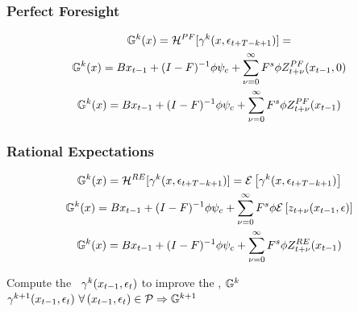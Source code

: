 \documentclass[tikz]{beamer}
\begin{document}
\begin{frame}
\frametitle{Perfect Foresight}




\begin{gather}
{\mathbb{G}}^{k}(x)=     \mathcal{H}^{PF}[{{\gamma}}^{k}(x,\epsilon_{t+T-k+1})]=\\
{\mathbb{G}}^{k}(x)={ B x_{t-1}+ (I - F)^{-1} \phi \psi_c } +   { \sum_{{\nu}=0}^\infty F^s \phi Z^{PF}_{t+{\nu}}(x_{t-1},0) }\\
 {\mathbb{G}}^{k}(x)={ B x_{t-1}+ (I - F)^{-1} \phi \psi_c } + { \sum_{{\nu}=0}^\infty F^s \phi {Z^{PF}_{t+{\nu}}(x_{t-1})} }
\end{gather}

\end{frame}
\begin{frame}
  
 \frametitle{Rational Expectations}

 \begin{gather}
 {\mathbb{G}}^{k}(x)=     \mathcal{H}^{RE}[{{\gamma}}^{k}(x,\epsilon_{t+T-k+1})]=
 {\mathcal{E}\left [ {{\gamma}}^{k}(x,\epsilon_{t+T-k+1}) \right ]}\\
  {\mathbb{G}}^{k}(x)={ B x_{t-1}+ (I - F)^{-1} \phi \psi_c } + { \sum_{{\nu}=0}^\infty F^s \phi {\mathcal{E}\left [ z_{t+{\nu}}(x_{t-1},\epsilon) \right ]} }\\
 {\mathbb{G}}^{k}(x)={ B x_{t-1}+ (I - F)^{-1} \phi \psi_c } + { \sum_{{\nu}=0}^\infty F^s \phi {Z^{RE}_{t+{\nu}}(x_{t-1})} }
 \end{gather}

\end{frame}


\begin{frame}[fragile]

{\small
}

{\small
  \begin{algorithm}[H]{Compute the \ADR\ ${{\gamma}}^k({x_{t-1},\epsilon_t})$ to improve the \ADRCE, ${\mathbb{G}}^{k}$}\\
${{\gamma}}^{k+1}({x_{t-1},\epsilon_t})\,\,  \forall \, ({x_{t-1},\epsilon_t})\in {\mathcal{P}} \Rightarrow {\mathbb{G}}^{k+1} $\;

\end{algorithm}
}

\end{frame}
\end{document}
